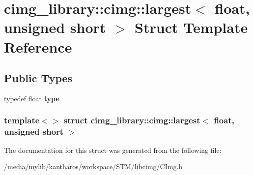 \hypertarget{structcimg__library_1_1cimg_1_1largest_3_01float_00_01unsigned_01short_01_4}{
\section{cimg\_\-library::cimg::largest$<$ float, unsigned short $>$ Struct Template Reference}
\label{structcimg__library_1_1cimg_1_1largest_3_01float_00_01unsigned_01short_01_4}
}
\subsection*{Public Types}
\begin{DoxyCompactItemize}
\item 
\hypertarget{structcimg__library_1_1cimg_1_1largest_3_01float_00_01unsigned_01short_01_4_a2091226567888915fa4c4408d7874ff6}{
typedef float {\bfseries type}}
\label{structcimg__library_1_1cimg_1_1largest_3_01float_00_01unsigned_01short_01_4_a2091226567888915fa4c4408d7874ff6}

\end{DoxyCompactItemize}
\subsubsection*{template$<$$>$ struct cimg\_\-library::cimg::largest$<$ float, unsigned short $>$}



The documentation for this struct was generated from the following file:\begin{DoxyCompactItemize}
\item 
/media/mylib/kantharos/workspace/STM/libcimg/CImg.h\end{DoxyCompactItemize}
